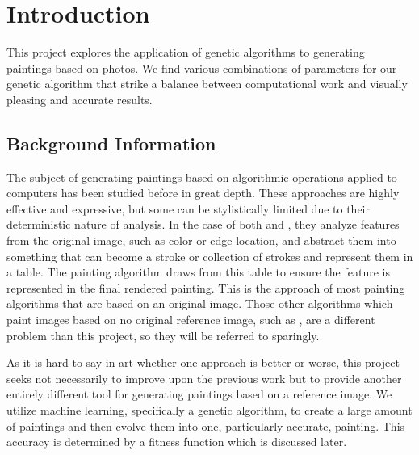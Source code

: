 


\section{Introduction}

This project explores the application of genetic algorithms to generating paintings based on photos. We find various combinations of parameters for our genetic algorithm that strike a balance between computational work and visually pleasing and accurate results. 

\subsection{Background Information}
The subject of generating paintings based on algorithmic operations applied to computers has been studied before in great depth.\cite{synergistic}\cite{monet}\cite{organicpainting} These approaches are highly effective and expressive, but some can be stylistically limited due to their deterministic nature of analysis. In the case of both \cite{synergistic} and \cite{monet}, they analyze features from the original image, such as color or edge location, and abstract them into something that can become a stroke or collection of strokes and represent them in a table. The painting algorithm draws from this table to ensure the feature is represented in the final rendered painting. This is the approach of most painting algorithms that are based on an original image. Those other algorithms which paint images based on no original reference image, such as \cite{organicpainting}, are a different problem than this project, so they will be referred to sparingly. 

As it is hard to say in art whether one approach is better or worse, this project seeks not necessarily to improve upon the previous work but to provide another entirely different tool for generating paintings based on a reference image. We utilize machine learning, specifically a genetic algorithm, to create a large amount of paintings and then evolve them into one, particularly accurate, painting. This accuracy is determined by a fitness function which is discussed later. 

